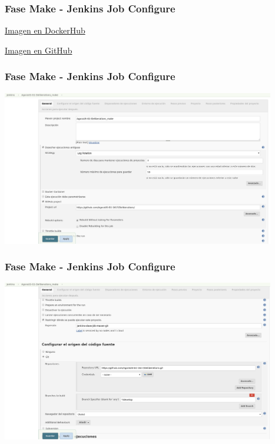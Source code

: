 \documentclass[
xcolor={svgnames},
hyperref={colorlinks,citecolor=DeepPink4,linkcolor=Black,urlcolor=DarkBlue}
]{beamer}
\begin{document}
\begin{frame}
	\frametitle{Fase Make - Jenkins Job Configure}
	\href{https://hub.docker.com/r/mzagar/jenkins-slave-jdk-maven-git/}{Imagen en DockerHub}
	
	\vspace{0.5in}
	\href{https://github.com/mzagar/jenkins-slave-jdk-maven-git}{Imagen en GitHub}
\end{frame}

\begin{frame}
	\frametitle{Fase Make - Jenkins Job Configure}
	\begin{center}
		\includegraphics[width=4.7in]{images/jenkins/make_a/jenkins_makeA_1.png}
	\end{center}
\end{frame}

\begin{frame}
	\frametitle{Fase Make - Jenkins Job Configure}
	\begin{center}
		\includegraphics[width=4.7in]{images/jenkins/make_a/jenkins_makeA_2.png}
	\end{center}
\end{frame}
\end{document}
